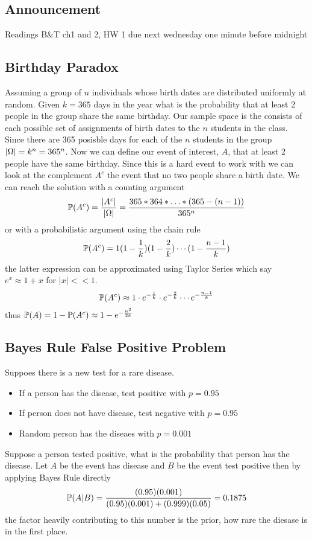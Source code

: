 \documentclass[11pt]{scrartcl}
\begin{document}
\subsection{Announcement}
Readings B\&T ch1 and 2, HW 1 due next wednesday one minute before midnight 

\subsection{Birthday Paradox} 
Assuming a group of $n$ individuals whose birth dates are distributed uniformly
at random. Given $k=365$ days in the year what is the probability that at least
2 people in the group share the same birthday. Our sample space is the consists
  of each possible set of assignments of birth dates to the  $n$ students in
  the class. Since there are 365 posisble days for each of the  $n$ students in
  the group $|\Omega| = k^{n} = 365^{n} $. Now we can define our event of
  interest, $A$, that at least 2 people have the same birthday. Since this is
  a hard event to work with we can look at the complement $A^{c} $ the event
  that no two people share a birth date. We can reach the solution with
  a counting argument
  \[
    \mathbb{P}(A^{c}) = \frac{|A^{c}|}{|\Omega|} = \frac{365 * 364 *\ldots*(365
    - (n-1))}{365^{n} }
  \]
  or with a probabilistic argument using the chain rule \[
    \mathbb{P}(A^{c} ) = 1(1-\frac{1}{k})(1-\frac{2}{k})\cdots(1 - \frac{n-1}{k})
  \]
  the latter expression can be approximated using Taylor Series which say
  $e^{x} \approx 1 + x $ for $|x|<<1$.  \[
    \mathbb{P}(A^{c} )\approx 1\cdot e^{-\frac{1}{k}} \cdot e^{-\frac{2}{k}} \cdots
    e^{-\frac{n-1}{k}} 
  \] thus $\mathbb{P}(A)=1-\mathbb{P}(A^{c} )\approx 1 - e^{-\frac{n^2}{2k}} $ 

\subsection{Bayes Rule False Positive Problem} 
Suppoes there is a new test for a rare disease. 
\begin{itemize}
  \item If a person has the disease, test positive with $p=0.95$
     \item If person does not have disease, test negative with $p=0.95$ 
       \item Random person has the diseaes with $p=0.001$
\end{itemize}
Suppose a person tested positive, what is the probability that person has the
disease. Let $A$ be the event has disease and  $B$ be the event test positive
then by applying Bayes Rule directly  \[
  \mathbb{P}(A|B) = \frac{(0.95)(0.001)}{(0.95)(0.001) + (0.999)(0.05)} = 0.1875
\] the factor heavily contributing to this number is the prior, how rare the
diesase is in the first place. 
\end{document}
